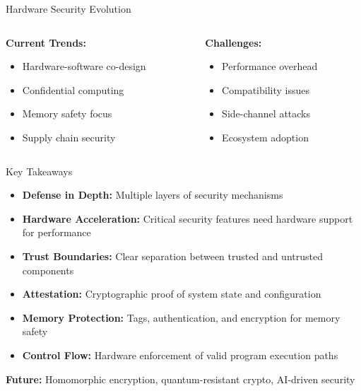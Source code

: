 \documentclass[aspectratio=169,12pt]{beamer}
\begin{document}
\begin{frame}{Hardware Security Evolution}
    \vspace{0.5cm}
    \begin{columns}
        \begin{column}{0.5\textwidth}
            \textbf{Current Trends:}
            \begin{itemize}
                \item Hardware-software co-design
                \item Confidential computing
                \item Memory safety focus
                \item Supply chain security
            \end{itemize}
        \end{column}
        \begin{column}{0.5\textwidth}
            \textbf{Challenges:}
            \begin{itemize}
                \item Performance overhead
                \item Compatibility issues
                \item Side-channel attacks
                \item Ecosystem adoption
            \end{itemize}
        \end{column}
    \end{columns}
\end{frame}

\begin{frame}{Key Takeaways}
    \begin{itemize}
        \item \textbf{Defense in Depth:} Multiple layers of security mechanisms
        \vspace{0.3cm}
        \item \textbf{Hardware Acceleration:} Critical security features need hardware support for performance
        \vspace{0.3cm}
        \item \textbf{Trust Boundaries:} Clear separation between trusted and untrusted components
        \vspace{0.3cm}
        \item \textbf{Attestation:} Cryptographic proof of system state and configuration
        \vspace{0.3cm}
        \item \textbf{Memory Protection:} Tags, authentication, and encryption for memory safety
        \vspace{0.3cm}
        \item \textbf{Control Flow:} Hardware enforcement of valid program execution paths
    \end{itemize}
    
    \vspace{0.5cm}
    \begin{tcolorbox}[colback=blue!20]
        \centering
        \textbf{Future:} Homomorphic encryption, quantum-resistant crypto, AI-driven security
    \end{tcolorbox}
\end{frame}
\end{document}
